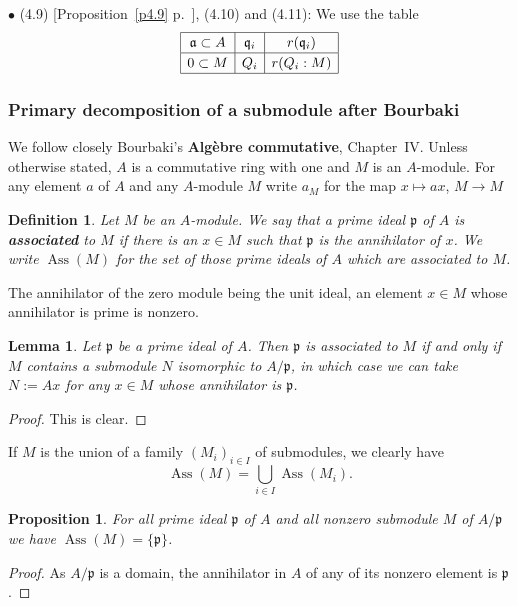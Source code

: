 \documentclass[12pt,letterpaper]{article}%
\newcommand{\oo}{\operatorname}\newcommand{\ooo}{\operatorname*}
\newcommand{\mf}{\mathfrak}
\newcommand{\aaa}{\mf a}
\newcommand{\ppp}{\mf p}
\newcommand{\qqq}{\mf q}
\newcommand{\Ass}{\oo{Ass}}
\newcommand{\bu}{\bullet}
\newcommand{\nn}{\noindent}
\newtheorem{df}[thm]{Definition}
\newtheorem{lem}[thm]{Lemma}
\newtheorem{prop}[thm]{Proposition}
\begin{document}

\nn$\bu$ (4.9) [Proposition~\ref{p4.9} p.~\pageref{p4.9}], (4.10) and (4.11): We use the table
$$
{\renewcommand{\arraystretch}{1.2}
\begin{array}{|c|c|c|}\hline
\aaa\subset A&\qqq_i&r(\qqq_i)\\ \hline 
0\subset M&Q_i&r(Q_i:M)\\ \hline
\end{array}}
$$ 

\subsubsection{Primary decomposition of a submodule after Bourbaki}%

We follow closely Bourbaki's \textbf{Algèbre commutative}, Chapter~IV. Unless otherwise stated, $A$ is a commutative ring with one and $M$ is an $A$-module. For any element $a$ of $A$ and any $A$-module $M$ write $a_M$ for the map $x\mapsto ax$, $M\to M$

\begin{df}
Let $M$ be an $A$-module. We say that a prime ideal $\ppp$ of $A$ is \textbf{associated} to $M$ if there is an $x\in M$ such that  $\ppp$ is the annihilator of $x$. We write $\Ass(M)$ for the set of those prime ideals of $A$ which are associated to $M$. 
\end{df}

The annihilator of the zero module being the unit ideal, an element $x\in M$ whose annihilator is prime is nonzero. 

\begin{lem}\label{ail0}
Let $\ppp$ be a prime ideal of $A$. Then $\ppp$ is associated to $M$ if and only if $M$ contains a submodule $N$ isomorphic to $A/\ppp$, in which case we can take $N:=Ax$ for any $x\in M$ whose annihilator is $\ppp$. 
\end{lem}
\begin{proof}
This is clear.
\end{proof}

If $M$ is the union of a family $(M_i)_{i\in I}$ of submodules, we clearly have
\begin{equation}\label{ai1}
\Ass(M)=\bigcup_{i\in I}\Ass(M_i).
\end{equation}

\begin{prop}\label{aip1}
For all prime ideal $\ppp$ of $A$ and all nonzero submodule $M$ of $A/\ppp$ we have $\Ass(M)=\{\ppp\}$. 
\end{prop}
\begin{proof}
As $A/\ppp$ is a domain, the annihilator in $A$ of any of its nonzero element is $\ppp$.
\end{proof}
\end{document}
